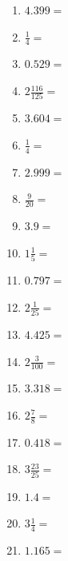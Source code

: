 \documentclass[12pt]{article}
\begin{document}
\begin{enumerate}
\item \large $ 4.399 = $ \vspace{1.5cm}
\newpage
\item \large $ \frac{1}{4} = $ \vspace{1.5cm}
\item \large $ 0.529 = $ \vspace{1.5cm}
\item \large $ 2 \frac{116}{125} = $ \vspace{1.5cm}
\item \large $ 3.604 = $ \vspace{1.5cm}
\item \large $ \frac{1}{4} = $ \vspace{1.5cm}
\item \large $ 2.999 = $ \vspace{1.5cm}
\item \large $ \frac{9}{20} = $ \vspace{1.5cm}
\item \large $ 3.9 = $ \vspace{1.5cm}
\item \large $ 1 \frac{1}{5} = $ \vspace{1.5cm}
\item \large $ 0.797 = $ \vspace{1.5cm}
\newpage
\item \large $ 2 \frac{1}{25} = $ \vspace{1.5cm}
\item \large $ 4.425 = $ \vspace{1.5cm}
\item \large $ 2 \frac{3}{100} = $ \vspace{1.5cm}
\item \large $ 3.318 = $ \vspace{1.5cm}
\item \large $ 2 \frac{7}{8} = $ \vspace{1.5cm}
\item \large $ 0.418 = $ \vspace{1.5cm}
\item \large $ 3 \frac{23}{25} = $ \vspace{1.5cm}
\item \large $ 1.4 = $ \vspace{1.5cm}
\item \large $ 3 \frac{1}{4} = $ \vspace{1.5cm}
\item \large $ 1.165 = $ \vspace{1.5cm}

\end{enumerate}
\end{document}
